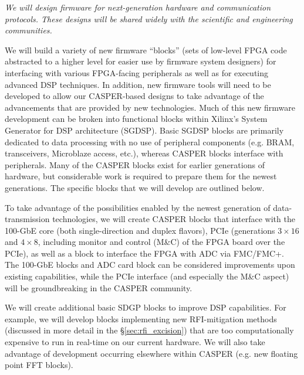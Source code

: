 \documentclass[10pt]{myNSF}
\begin{document}
\label{sec:firmware}

\emph{We will design firmware for next-generation hardware and
  communication protocols.  These designs will be shared widely with
  the scientific and engineering communities.}

We will build a variety of new firmware ``blocks'' (sets of low-level
FPGA code abstracted to a higher level for easier use by firmware
system designers) for interfacing with various FPGA-facing peripherals
as well as for executing advanced DSP techniques.  In addition, new
firmware tools will need to be developed to allow our CASPER-based
designs to take advantage of the advancements that are provided by new
technologies.  Much of this new firmware development can be broken
into functional blocks within Xilinx's System Generator for DSP
architecture (SGDSP). Basic SGDSP blocks are primarily dedicated to
data processing with no use of peripheral components (e.g. BRAM,
transceivers, Microblaze access, etc.), whereas CASPER blocks interface
with peripherals. Many of the CASPER blocks exist for earlier
generations of hardware, but considerable work is required to prepare
them for the newest generations.  The specific blocks that we will
develop are outlined below.

 To take advantage of the
possibilities enabled by the newest generation of data-transmission
technologies, we will create CASPER blocks that interface with the
100-GbE core (both single-direction and duplex flavors), PCIe
(generations $3 \times 16$ and $4 \times 8$, including monitor and
control (M\&C) of the FPGA board over the PCIe), as well as a block to
interface the FPGA with ADC via FMC/FMC+.  The 100-GbE blocks and ADC
card block can be considered improvements upon existing capabilities,
while the PCIe interface (and especially the M\&C aspect) will be
groundbreaking in the CASPER community.

 We will create additional basic SDGP
blocks to improve DSP capabilities.  For example, we will develop
blocks implementing new RFI-mitigation methods (discussed in more
detail in the \S\ref{sec:rfi_excision}) that are too computationally
expensive to run in real-time on our current hardware.  We will also
take advantage of development occurring elsewhere within CASPER
(e.g. new floating point FFT blocks).
\end{document}
